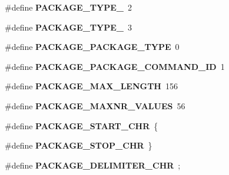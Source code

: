 \begin{DoxyCompactItemize}
\item 
\hypertarget{group___engduino_protocol_gaab072fe48f6582fbd93d46d9500ac3a9}{}\#define {\bfseries P\+A\+C\+K\+A\+G\+E\+\_\+\+T\+Y\+P\+E\+\_}~2\label{group___engduino_protocol_gaab072fe48f6582fbd93d46d9500ac3a9}

\item 
\hypertarget{group___engduino_protocol_ga6e792782a06c8f35f19aa014ef944340}{}\#define {\bfseries P\+A\+C\+K\+A\+G\+E\+\_\+\+T\+Y\+P\+E\+\_}~3\label{group___engduino_protocol_ga6e792782a06c8f35f19aa014ef944340}

\item 
\hypertarget{group___engduino_protocol_ga7d3e82a54524c81775c29fe4a5755144}{}\#define {\bfseries P\+A\+C\+K\+A\+G\+E\+\_\+\+P\+A\+C\+K\+A\+G\+E\+\_\+\+T\+Y\+P\+E}~0\label{group___engduino_protocol_ga7d3e82a54524c81775c29fe4a5755144}

\item 
\hypertarget{group___engduino_protocol_gaab64f7009fad88a94edab1632981002f}{}\#define {\bfseries P\+A\+C\+K\+A\+G\+E\+\_\+\+P\+A\+C\+K\+A\+G\+E\+\_\+\+C\+O\+M\+M\+A\+N\+D\+\_\+\+I\+D}~1\label{group___engduino_protocol_gaab64f7009fad88a94edab1632981002f}

\item 
\hypertarget{group___engduino_protocol_ga3c3d2e608ff5e5d2b69b5d3c3981530f}{}\#define {\bfseries P\+A\+C\+K\+A\+G\+E\+\_\+\+M\+A\+X\+\_\+\+L\+E\+N\+G\+T\+H}~156\label{group___engduino_protocol_ga3c3d2e608ff5e5d2b69b5d3c3981530f}

\item 
\hypertarget{group___engduino_protocol_ga134da01c6d7e220003b4070a407e7187}{}\#define {\bfseries P\+A\+C\+K\+A\+G\+E\+\_\+\+M\+A\+X\+N\+R\+\_\+\+V\+A\+L\+U\+E\+S}~56\label{group___engduino_protocol_ga134da01c6d7e220003b4070a407e7187}

\item 
\hypertarget{group___engduino_protocol_gace5485f40a354fc160ecbe795e9930f4}{}\#define {\bfseries P\+A\+C\+K\+A\+G\+E\+\_\+\+S\+T\+A\+R\+T\+\_\+\+C\+H\+R}~\textquotesingle{}\{\textquotesingle{}\label{group___engduino_protocol_gace5485f40a354fc160ecbe795e9930f4}

\item 
\hypertarget{group___engduino_protocol_gac00577603bfbe2bce6a7d709ebcab17e}{}\#define {\bfseries P\+A\+C\+K\+A\+G\+E\+\_\+\+S\+T\+O\+P\+\_\+\+C\+H\+R}~\textquotesingle{}\}\textquotesingle{}\label{group___engduino_protocol_gac00577603bfbe2bce6a7d709ebcab17e}

\item 
\hypertarget{group___engduino_protocol_ga68fd86d7b34416ea2e90c0a66d907161}{}\#define {\bfseries P\+A\+C\+K\+A\+G\+E\+\_\+\+D\+E\+L\+I\+M\+I\+T\+E\+R\+\_\+\+C\+H\+R}~\textquotesingle{};\textquotesingle{}\label{group___engduino_protocol_ga68fd86d7b34416ea2e90c0a66d907161}


\end{DoxyCompactItemize}
